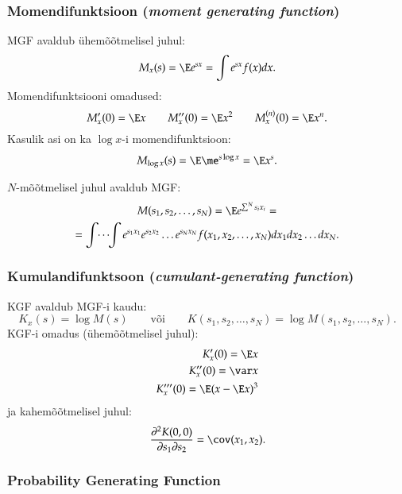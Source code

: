 \documentclass[a4paper]{article}
\numberwithin{equation}{subsection}
\begin{document}
\subsubsection{Momendifunktsioon (\emph{moment generating function})}

MGF avaldub ühemõõtmelisel juhul:
\begin{equation}
M_x (s) = \E e^{sx} = \int e^{sx} f(x) dx.
\end{equation}
Momendifunktsiooni omadused:
\begin{equation}
M_x'(0) = \E x \qquad M_x''(0) = \E x^2 \qquad 
  M_x^{(n)}(0) = \E x^n.
\end{equation}
Kasulik asi on ka $\log x$-i momendifunktsioon:
\begin{equation}
M_{\log x}(s) = \E \me^{s \log x} = \E x^s.
\end{equation}

$N$-mõõtmelisel juhul avaldub MGF:
\begin{multline}
M( s_1,s_2,\ldots,s_N) = \E e^{\sum^N s_i x_i} = \\
= \idotsint e^{s_1 x_1}
  e^{s_2 x_2} \ldots e^{s_N x_N} f(x_1,x_2,\ldots, x_N) dx_1 dx_2 \ldots
  dx_N. 
\end{multline}

\subsubsection{Kumulandifunktsoon (\emph{cumulant-generating function})}

KGF avaldub MGF-i kaudu:
\begin{equation}
K_x(s) = \log M(s) 
  \qquad \mbox{või} \qquad
K(s_1,s_2,\ldots,s_N) = \log M( s_1,s_2,\ldots,s_N).
\end{equation}
KGF-i omadus (ühemõõtmelisel juhul):
\begin{eqnarray}
K_x'(0) = \E x \\
K_x''(0) = \var x\\
K_x'''(0) = \E(x-\E x)^3
\end{eqnarray}
ja kahemõõtmelisel juhul:
\begin{equation}
\frac{\partial^2 K(0,0)}{\partial s_1 \partial s_2} =
  \cov( x_1, x_2).
\end{equation}


\subsubsection{Probability Generating Function}
\label{sec:probability_generating_function}
\end{document}
